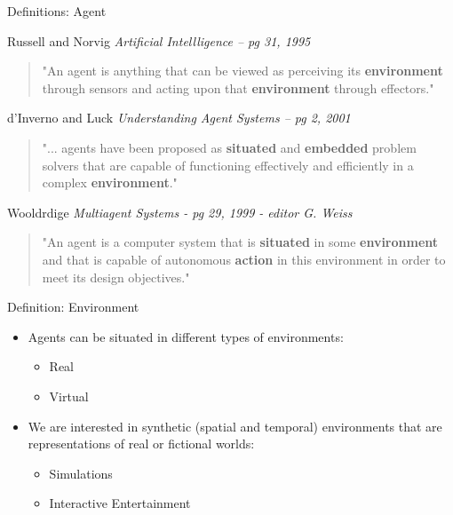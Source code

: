 \documentclass[aspectratio=1610,xcolor=dvipsnames,t]{beamer}
\begin{document}
\begin{frame}{Definitions: Agent} 
    \begin{block}{Russell and Norvig \emph{Artificial Intellligence -- pg 31, 1995}}
        \begin{quote}
            "An agent is anything that can be viewed as perceiving its 
            \textbf{environment} through sensors and acting upon that
            \textbf{environment} through effectors."
        \end{quote}
    \end{block} 

    \begin{block}{d'Inverno and Luck \emph{Understanding Agent Systems -- pg 2, 2001}}
        \begin{quote}
            "... agents have been proposed as \textbf{situated} and 
            \textbf{embedded} problem solvers that are capable of functioning
            effectively and efficiently in a complex \textbf{environment}."
         \end{quote} 
    \end{block} 

    \begin{block}{Wooldrdige \emph{Multiagent Systems - pg 29, 1999 - editor G. Weiss}}
        \begin{quote}
            "An agent is a computer system that is \textbf{situated} in some
            \textbf{environment} and that is capable of autonomous 
            \textbf{action} in this environment in order to meet its
            design objectives."
        \end{quote}
    \end{block} 

\end{frame} 

\begin{frame}{Definition: Environment}
    \begin{itemize}
        \item Agents can be situated in different types
              of environments:
              \begin{itemize}
                    \item Real
                    \item Virtual
              \end{itemize}
        \item We are interested in synthetic (spatial and temporal)
              environments that are representations of real
              or fictional worlds:
                \begin{itemize}
                    \item Simulations
                    \item Interactive Entertainment
                \end{itemize}
    \end{itemize}
\end{frame} 
\end{document}
